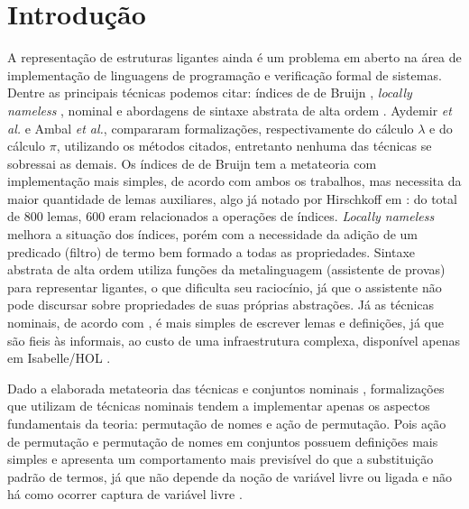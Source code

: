 \chapter{Introdução}\label{chp:intro}

A representação de estruturas ligantes ainda é um problema em aberto na área de implementação de linguagens de programação e verificação formal de sistemas. Dentre as principais técnicas podemos citar: índices de de Bruijn \cite{Bruijn1972}, \textit{locally nameless} \cite{Chargueraud2011}, nominal \cite{Gabbay2002} e abordagens de sintaxe abstrata de alta ordem \cite{Pfenning1988,Harper1993}. Aydemir \textit{et al.} \cite{Aydemir2008} e Ambal \cite{Ambal2020} \textit{et al.}, compararam formalizações, respectivamente do cálculo $\lambda$ e do cálculo $\pi$, utilizando os métodos citados, entretanto nenhuma das técnicas se sobressai as demais. Os índices de de Bruijn tem a metateoria com implementação mais simples, de acordo com ambos os trabalhos, mas necessita da maior quantidade de lemas auxiliares, algo já notado por Hirschkoff em \cite{Hirschkoff1997}: do total de 800 lemas, 600 eram relacionados a operações de índices. \textit{Locally nameless} melhora a situação dos índices, porém com a necessidade da adição de um predicado (filtro) de termo bem formado a todas as propriedades. Sintaxe abstrata de alta ordem utiliza funções da metalinguagem (assistente de provas) para representar ligantes, o que dificulta seu raciocínio, já que o assistente não pode discursar sobre propriedades de suas próprias abstrações. Já as técnicas nominais, de acordo com \cite{Ambal2020}, é mais simples de escrever lemas e definições, já que são fieis às informais, ao custo de uma infraestrutura complexa, disponível apenas em Isabelle/HOL \cite{Aydemir2008}.


Dado a elaborada metateoria das técnicas e conjuntos nominais \cite{Pitts2006,Pitts2013}, formalizações que utilizam de técnicas nominais \cite{Aydemir2007, Urban2008, Copello2016, Copello2018, Ambal2020} tendem a implementar apenas os aspectos fundamentais da teoria: permutação de nomes e ação de permutação. Pois ação de permutação e permutação de nomes em conjuntos possuem definições mais simples e apresenta um comportamento mais previsível do que a substituição padrão de termos, já que não depende da noção de variável livre ou ligada e não há como ocorrer captura de variável livre \cite{Choudhury2015}.


